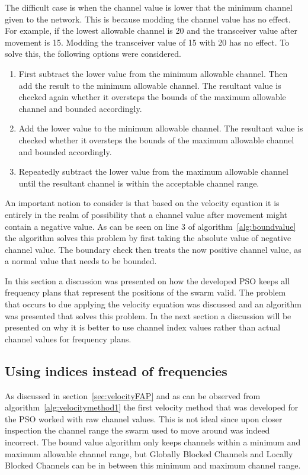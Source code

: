 The difficult case is when the channel value is lower that the minimum channel given to the network. This is because modding the channel value has no effect. For example, if the lowest allowable channel is 20 and the transceiver value after movement is 15.
Modding the transceiver value of 15 with 20 has no effect. To solve this, the following options were considered.

\begin{enumerate}
\item First subtract the lower value from the minimum allowable channel. Then add the result to the minimum allowable channel. The resultant value is checked again whether it oversteps the bounds of the maximum allowable channel and bounded accordingly.
\item Add the lower value to the minimum allowable channel. The resultant value is checked whether it oversteps the bounds of the maximum allowable channel and bounded accordingly.
\item Repeatedly subtract the lower value from the maximum allowable channel until the resultant channel is within the acceptable channel range.
\end{enumerate}

An important notion to consider is that based on the velocity equation it is entirely in the realm of possibility that a channel value after movement might contain a negative value. As can be seen on line 3 of algorithm~\ref{alg:boundvalue} the algorithm solves this problem by first taking the absolute value of negative channel value. The boundary check then treats the now positive channel value, as a normal value that needs to be bounded.

In this section a discussion was presented on how the developed PSO keeps all frequency plans that represent the positions of the swarm valid. The problem that occurs to due applying the velocity equation was discussed and an algorithm was presented that solves this problem. In the next section a discussion will be presented on why it is better to use channel index values rather than actual channel values for frequency plans. 
\subsection{Using indices instead of frequencies}
\label{sec:velocityFAP2}
As discussed in section~\ref{sec:velocityFAP} and as can be observed from algorithm~\ref{alg:velocitymethod1} the first velocity method that was developed for the PSO worked with raw channel values. This is not ideal since upon closer inspection the channel range the swarm used to move around was indeed incorrect. The bound value algorithm only keeps channels within a minimum and maximum allowable channel range, but Globally Blocked Channels and Locally Blocked Channels can be in between this minimum and maximum channel range. 

